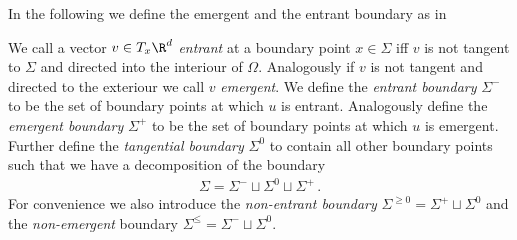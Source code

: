 In the following we define the emergent and the entrant boundary as in \cite[p.282]{Morse1970}
\begin{definition}\label{df:emergentEntrantBd}
  We call a vector $v\in T_x\R^d$ \emph{entrant} at a boundary point $x\in\Sigma$ iff $v$ is not tangent to $\Sigma$
  and directed into the interiour of $\Omega$. Analogously if $v$ is not tangent and
  directed to the exteriour we call $v$ \emph{emergent}.
  We define the \emph{entrant boundary} $\Sigma^-$ to be the set of boundary points at which $u$ is entrant.
  Analogously define the \emph{emergent boundary} $\Sigma^+$ to be the set of boundary points at which
  $u$ is emergent.
  Further define the \emph{tangential boundary} $\Sigma^0$ to contain all other boundary points such that we have a decomposition
  of the boundary
  \begin{align*}
    \Sigma=\Sigma^-\sqcup\Sigma^0\sqcup\Sigma^+\,.
  \end{align*}
  For convenience we also introduce the \emph{non-entrant boundary} $\Sigma^{\geq0}=\Sigma^+\sqcup\Sigma^0$ and the 
  \emph{non-emergent} boundary  $\Sigma^{\leq}=\Sigma^-\sqcup\Sigma^0$.
\end{definition}

